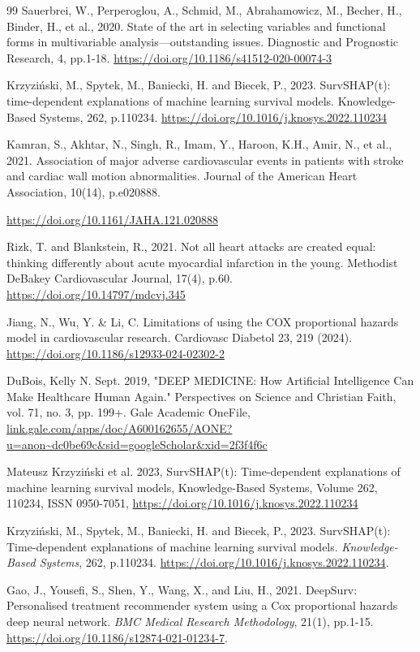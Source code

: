 \documentclass[a4paper,12pt]{article}
\begin{document}
\begin{thebibliography}{99}
 Sauerbrei, W., Perperoglou, A., Schmid, M., Abrahamowicz, M., Becher, H., Binder, H., et al., 2020. State of the art in selecting variables and functional forms in multivariable analysis—outstanding issues. Diagnostic and Prognostic Research, 4, pp.1-18.
\url{https://doi.org/10.1186/s41512-020-00074-3}

Krzyziński, M., Spytek, M., Baniecki, H. and Biecek, P., 2023. SurvSHAP(t): time-dependent explanations of machine learning survival models. Knowledge-Based Systems, 262, p.110234.
\url{https://doi.org/10.1016/j.knosys.2022.110234}


 Kamran, S., Akhtar, N., Singh, R., Imam, Y., Haroon, K.H., Amir, N., et al., 2021. Association of major adverse cardiovascular events in patients with stroke and cardiac wall motion abnormalities. Journal of the American Heart Association, 10(14), p.e020888.

\url{https://doi.org/10.1161/JAHA.121.020888}


 Rizk, T. and Blankstein, R., 2021. Not all heart attacks are created equal: thinking differently about acute myocardial infarction in the young. Methodist DeBakey Cardiovascular Journal, 17(4), p.60.
\url{https://doi.org/10.14797/mdcvj.345}

 Jiang, N., Wu, Y. \& Li, C. Limitations of using the COX proportional hazards model in cardiovascular research. Cardiovasc Diabetol 23, 219 (2024). \url{https://doi.org/10.1186/s12933-024-02302-2}


 DuBois, Kelly N. Sept. 2019, "DEEP MEDICINE: How Artificial Intelligence Can Make Healthcare Human Again." Perspectives on Science and Christian Faith, vol. 71, no. 3,  pp. 199+. Gale Academic OneFile, \url{link.gale.com/apps/doc/A600162655/AONE?u=anon~dc0be69c&sid=googleScholar&xid=2f3f4f6c}

 Mateusz Krzyziński et al. 2023, SurvSHAP(t): Time-dependent explanations of machine learning survival models, Knowledge-Based Systems, Volume 262, 110234, ISSN 0950-7051, \url{https://doi.org/10.1016/j.knosys.2022.110234}


   Krzyziński, M., Spytek, M., Baniecki, H. and Biecek, P., 2023. SurvSHAP(t): Time-dependent explanations of machine learning survival models. \textit{Knowledge-Based Systems}, 262, p.110234. \url{https://doi.org/10.1016/j.knosys.2022.110234}.
    
  Gao, J., Yousefi, S., Shen, Y., Wang, X., and Liu, H., 2021. DeepSurv: Personalised treatment recommender system using a Cox proportional hazards deep neural network. \textit{BMC Medical Research Methodology}, 21(1), pp.1-15. \url{https://doi.org/10.1186/s12874-021-01234-7}.
    

\end{thebibliography}
\end{document}
